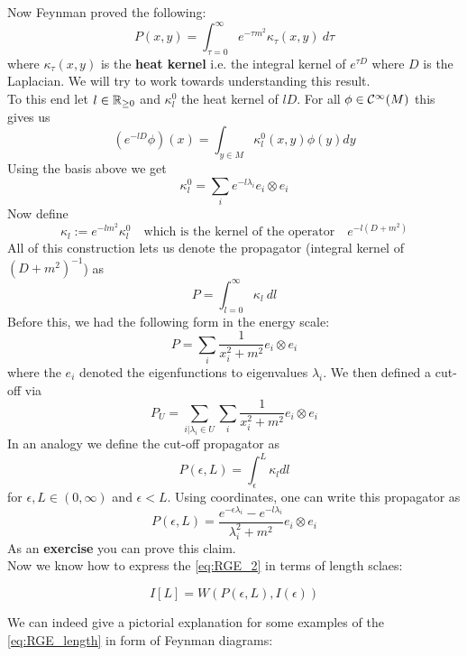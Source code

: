 Now Feynman proved the following:
$$ P(x,y) = \int_{\tau = 0}^{\infty} e^{- \tau m^2} \kappa_\tau (x,y) \ d\tau $$
where $\kappa_\tau (x,y)$ is the \textbf{heat kernel} i.e. the integral kernel of $e^{\tau D}$ where $D$ is the Laplacian. We will try to work towards understanding this result.\\

To this end let $l \in \mathbb{R}_{\geq 0}$ and $\kappa^0_l$ the heat kernel of $lD$. For all $\phi \in \Ci(M)$ this gives us
$$ \left( e^{-lD}\phi \right) (x) = \int_{y \in M} \kappa^0_l (x,y) \phi(y) dy $$
Using the basis above we get
$$ \kappa^0_l = \sum_i e^{-l \lambda_i} e_i \otimes e_i $$
Now define
$$ \kappa_l := e^{-l m^2} \kappa^0_l \quad \text{which is the kernel of the operator} \quad e^{-l (D+m^2)} $$
All of this construction lets us denote the propagator (integral kernel of $(D+m^2)^{-1}$) as
$$ P = \int_{l=0}^\infty \kappa_l \ dl $$
Before this, we had the following form in the energy scale:
$$ P = \sum_i \frac{1}{x_i^2 + m^2} e_i \otimes e_i $$
where the $e_i$ denoted the eigenfunctions to eigenvalues $\lambda_i$. We then defined a cut-off via
$$ P_U = \sum_{i|\lambda_i \in U} \sum_i \frac{1}{x_i^2 + m^2} e_i \otimes e_i$$
In an analogy we define the cut-off propagator as
$$ P(\epsilon, L) = \int_\epsilon^L \kappa_l dl  $$
for $\epsilon, L \in (0,\infty)$ and $\epsilon < L$. Using coordinates, one can write this propagator as
$$ P(\epsilon, L) = \frac{e^{-\epsilon \lambda_i} - e^{-l \lambda_i}}{\lambda_i^2 + m^2} e_i \otimes e_i $$
As an \textbf{exercise} you can prove this claim.\\

Now we know how to express the \eqref{eq:RGE_2} in terms of length sclaes:

\begin{equation}
\label{eq:RGE_length}\tag{L-RGE}
  I[L] = W(P(\epsilon, L), I(\epsilon))
\end{equation}

We can indeed give a pictorial explanation for some examples of the \eqref{eq:RGE_length} in form of Feynman diagrams:

